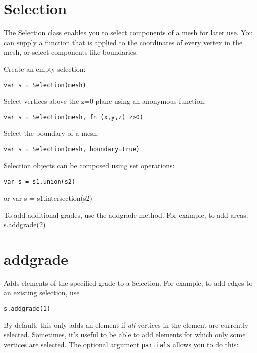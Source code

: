 \hypertarget{selection}{%
\section{Selection}\label{selection}}

The Selection class enables you to select components of a mesh for later
use. You can supply a function that is applied to the coordinates of
every vertex in the mesh, or select components like boundaries.

Create an empty selection:

\begin{lstlisting}
var s = Selection(mesh)
\end{lstlisting}

Select vertices above the z=0 plane using an anonymous function:

\begin{lstlisting}
var s = Selection(mesh, fn (x,y,z) z>0)
\end{lstlisting}

Select the boundary of a mesh:

\begin{lstlisting}
var s = Selection(mesh, boundary=true)
\end{lstlisting}

Selection objects can be composed using set operations:

\begin{lstlisting}
var s = s1.union(s2)
\end{lstlisting}

or var s = s1.intersection(s2)

To add additional grades, use the addgrade method. For example, to add
areas: s.addgrade(2)

\hypertarget{addgrade}{%
\section{addgrade}\label{addgrade}}

Adds elements of the specified grade to a Selection. For example, to add
edges to an existing selection, use

\begin{lstlisting}
s.addgrade(1)
\end{lstlisting}

By default, this only adds an element if \emph{all} vertices in the
element are currently selected. Sometimes, it's useful to be able to add
elements for which only some vertices are selected. The optional
argument \texttt{partials} allows you to do this:

